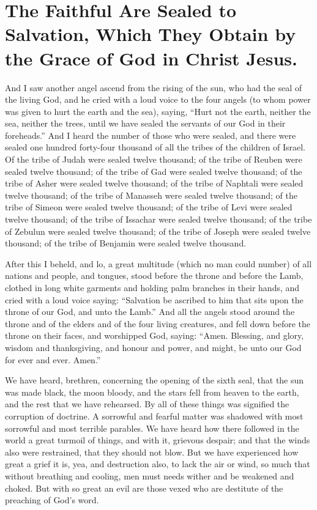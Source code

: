 \chapter[Sermon 35. The Faithful Are Sealed to Salvation, Which They Obtain by the Grace of God in Christ Jesus.]{The Faithful Are Sealed to Salvation, Which They Obtain by the Grace of God in Christ Jesus.}
\label{sermon:035}

And I saw another angel ascend from the rising of the sun, who had the seal of the living God, and he cried with a loud voice to the four angels (to whom power was given to hurt the earth and the sea), saying, “Hurt not the earth, neither the sea, neither the trees, until we have sealed the servants of our God in their foreheads.” And I heard the number of those who were sealed, and there were sealed one hundred forty-four thousand of all the tribes of the children of Israel. Of the tribe of Judah were sealed twelve thousand; of the tribe of Reuben were sealed twelve thousand; of the tribe of Gad were sealed twelve thousand; of the tribe of Asher were sealed twelve thousand; of the tribe of Naphtali were sealed twelve thousand; of the tribe of Manasseh were sealed twelve thousand; of the tribe of Simeon were sealed twelve thousand; of the tribe of Levi were sealed twelve thousand; of the tribe of Issachar were sealed twelve thousand; of the tribe of Zebulun were sealed twelve thousand; of the tribe of Joseph were sealed twelve thousand; of the tribe of Benjamin were sealed twelve thousand.

After this I beheld, and lo, a great multitude (which no man could number) of all nations and people, and tongues, stood before the throne and before the Lamb, clothed in long white garments and holding palm branches in their hands, and cried with a loud voice saying: “Salvation be ascribed to him that sits upon the throne of our God, and unto the Lamb.” And all the angels stood around the throne and of the elders and of the four living creatures, and fell down before the throne on their faces, and worshipped God, saying: “Amen. Blessing, and glory, wisdom and thanksgiving, and honour and power, and might, be unto our God for ever and ever. Amen.”

We have heard, brethren, concerning the opening of the sixth seal, that the sun was made black, the moon bloody, and the stars fell from heaven to the earth, and the rest that we have rehearsed. By all of these things was signified the corruption of doctrine. A sorrowful and fearful matter was shadowed with most sorrowful and most terrible parables. We have heard how there followed in the world a great turmoil of things, and with it, grievous despair; and that the winds also were restrained, that they should not blow. But we have experienced how great a grief it is, yea, and destruction also, to lack the air or wind, so much that without breathing and cooling, men must needs wither and be weakened and choked. But with so great an evil are those vexed who are destitute of the preaching of God’s word.

